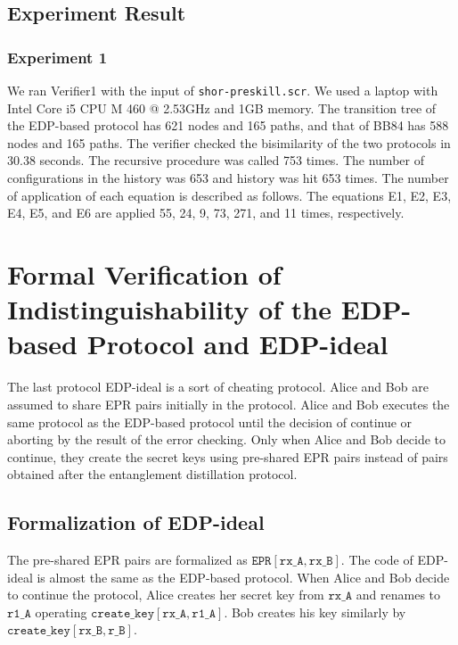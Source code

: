 \subsection{Experiment Result}
\subsubsection{Experiment 1}
We ran Verifier1 with the input of {\tt shor-preskill.scr}.
We used a laptop with Intel Core i5 CPU M 460 @ 2.53GHz and 1GB memory.
The transition tree of the EDP-based protocol has 621 nodes and 165
paths, and that of BB84 has 588 nodes and 165 paths.
The verifier checked the bisimilarity of the two protocols in 30.38
seconds. The recursive procedure was called 753 times. 
The number of configurations in the history was 653 and
history was hit 653 times. The number of application of each equation
is described as follows. The equations E1, E2, E3, E4, E5, and E6 are
applied 55, 24, 9, 73, 271, and 11 times, respectively.

\section{Formal Verification of Indistinguishability of the
EDP-based Protocol and EDP-ideal}
\label{fml:formalverif2}
The last protocol EDP-ideal is a sort of cheating protocol.
Alice and Bob are assumed to share EPR pairs initially in 
the protocol. Alice and Bob executes the same protocol as 
the EDP-based protocol until the decision of continue or aborting
by the result of the error checking. Only when Alice and Bob
decide to continue, 
they create the secret keys using pre-shared EPR pairs instead
of pairs obtained after the entanglement distillation protocol.

\subsection{Formalization of EDP-ideal}
The pre-shared EPR pairs are formalized as
$\mathtt{EPR[rx\_A,rx\_B]}$. The code of EDP-ideal is
almost the same as the EDP-based protocol. When
Alice and Bob decide to continue the protocol,
Alice creates her secret key from $\mathtt{rx\_A}$ and
renames to $\mathtt{r1\_A}$ operating
$\mathtt{create\_key[rx\_A,r1\_A]}$. Bob creates his key
similarly by $\mathtt{create\_key[rx\_B,r\_B]}$.

